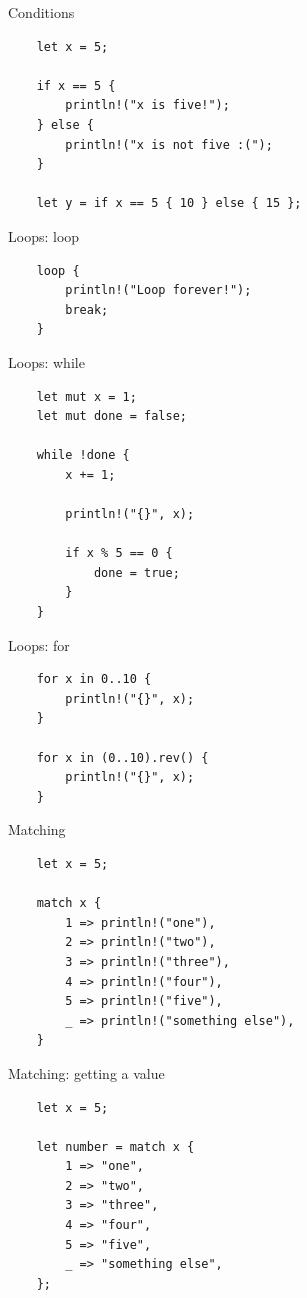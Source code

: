\documentclass[12pt, aspectratio=169]{beamer}
\begin{document}
\begin{frame}[fragile]{Conditions}
  \begin{verbatim}
    let x = 5;

    if x == 5 {
        println!("x is five!");
    } else {
        println!("x is not five :(");
    }

    let y = if x == 5 { 10 } else { 15 };
  \end{verbatim}
\end{frame}

\begin{frame}[fragile]{Loops: loop}
  \begin{verbatim}
    loop {
        println!("Loop forever!");
        break;
    }
  \end{verbatim}
\end{frame}

\begin{frame}[fragile]{Loops: while}
  \begin{verbatim}
    let mut x = 1;
    let mut done = false;

    while !done {
        x += 1;

        println!("{}", x);

        if x % 5 == 0 {
            done = true;
        }
    }
  \end{verbatim}
\end{frame}

\begin{frame}[fragile]{Loops: for}
  \begin{verbatim}
    for x in 0..10 {
        println!("{}", x);
    }

    for x in (0..10).rev() {
        println!("{}", x);
    }
  \end{verbatim}
\end{frame}

\begin{frame}[fragile]{Matching}
  \begin{verbatim}
    let x = 5;

    match x {
        1 => println!("one"),
        2 => println!("two"),
        3 => println!("three"),
        4 => println!("four"),
        5 => println!("five"),
        _ => println!("something else"),
    }
  \end{verbatim}
\end{frame}

\begin{frame}[fragile]{Matching: getting a value}
  \begin{verbatim}
    let x = 5;

    let number = match x {
        1 => "one",
        2 => "two",
        3 => "three",
        4 => "four",
        5 => "five",
        _ => "something else",
    };
  \end{verbatim}
\end{frame}
\end{document}
